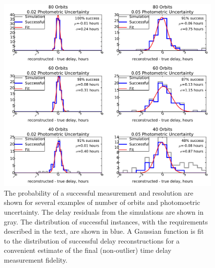 \documentclass{emulateapj}
\begin{document}

\begin{figure}[t]
\begin{center}
\includegraphics[width=\linewidth]{./systematic_examples.pdf}
\caption{The probability of a successful measurement and resolution
  are shown for several examples of number of orbits and photomoetric
  uncertainty. The delay residuals from the simulations are shown in
  gray. The distribution of successful instances, with the
  requirements described in the text, are shown in blue. A Gaussian
  function is fit to the distribution of successful delay
  reconstructions for a convenient estimate of the final (non-outlier)
  time delay measurement fidelity.}\label{fig:example}
\end{center}
\end{figure}
\end{document}
